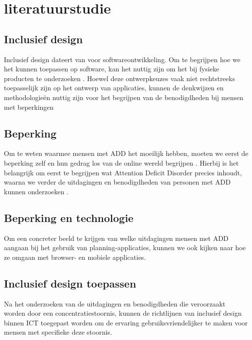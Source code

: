 
\section{literatuurstudie}%
\label{sec:literatuurstudie}

\subsection{Inclusief design} %
Inclusief design dateert van voor softwareontwikkeling. Om te begrijpen hoe we het kunnen toepassen op software, kan het nuttig zijn om het bij fysieke producten te onderzoeken \autocite{Clarkson2003}. Hoewel deze ontwerpkeuzes vaak niet rechtstreeks toepasselijk zijn op het ontwerp van applicaties, kunnen de denkwijzen en methodologieën nuttig zijn voor het begrijpen van de benodigdheden bij mensen met beperkingen \newline

\subsection{Beperking} %
Om te weten waarmee mensen met ADD het moeilijk hebben, moeten we eerst de beperking zelf en hun gedrag los van de online wereld  begrijpen \autocite{VanHerwegen2019} . Hierbij is het belangrijk om eerst te begrijpen wat Attention Deficit Disorder precies inhoudt, waarna we verder de uitdagingen en benodigdheden van personen met ADD kunnen onderzoeken \autocite{diamond2005attention}.
\newline

\subsection{Beperking en technologie} %
Om een concreter beeld te krijgen van welke uitdagingen mensen met ADD aangaan bij het gebruik van planning-applicaties, kunnen we ook kijken naar hoe ze omgaan met browser- \autocite{Harrysson2004} en mobiele \autocite{Rapp2019} applicaties. \newline

\subsection{Inclusief design toepassen} %
Na het onderzoeken van de uitdagingen en benodigdheden die veroorzaakt worden door een concentratiestoornis, kunnen de richtlijnen van inclusief design binnen ICT \autocite{Gulliksen2004, Nicolle2001, Roessvoll2013} toegepast worden om de ervaring gebruiksvriendelijker te maken voor mensen met specifieke deze stoornis.



